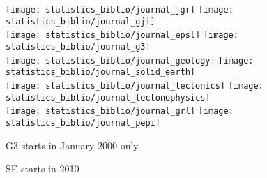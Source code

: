 \begin{center}
\texttt{[image: statistics\_biblio/journal\_jgr]}
\texttt{[image: statistics\_biblio/journal\_gji]}\\
\texttt{[image: statistics\_biblio/journal\_epsl]}
\texttt{[image: statistics\_biblio/journal\_g3]}\\
\texttt{[image: statistics\_biblio/journal\_geology]}
\texttt{[image: statistics\_biblio/journal\_solid\_earth]}\\
\texttt{[image: statistics\_biblio/journal\_tectonics]}
\texttt{[image: statistics\_biblio/journal\_tectonophysics]}\\
\texttt{[image: statistics\_biblio/journal\_grl]}
\texttt{[image: statistics\_biblio/journal\_pepi]}
\end{center}

G3 starts in January 2000 only

SE starts in 2010




